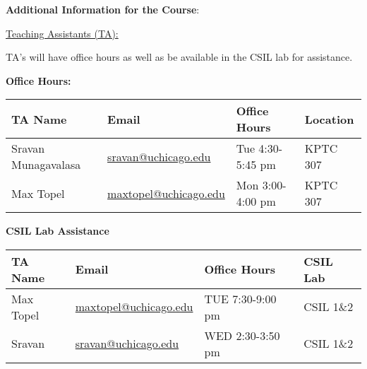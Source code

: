 \noindent \textbf {\Large \sc Additional Information for the Course}:

\vspace{1cm}

\noindent \underline{Teaching Assistants (TA):}

\noindent TA's will have office hours as well as be available in the CSIL lab for assistance.

\textbf{Office Hours:}

\begin{tabular}{l l | l | l }

TA Name & Email & Office Hours & Location \\ \hline

Sravan Munagavalasa & \href{mailto:sravan@uchicago.edu}{sravan@uchicago.edu}     & Tue 4:30-5:45 pm  & KPTC 307 \\
Max Topel           & \href{mailto:maxtopel@uchicago.edu}{maxtopel@uchicago.edu} & Mon 3:00-4:00 pm  & KPTC 307 \\


\end{tabular}

\vspace{1cm}

\textbf{CSIL Lab Assistance}

\begin{tabular}{l l | l | l }

TA Name & Email & Office Hours & CSIL Lab \\ \hline

Max Topel & \href{mailto:maxtopel@uchicago.edu}{maxtopel@uchicago.edu} & TUE  7:30-9:00 pm  & CSIL 1\&2 \\
Sravan    & \href{mailto:sravan@uchicago.edu}{sravan@uchicago.edu}     & WED  2:30-3:50 pm  & CSIL 1\&2 \\


\end{tabular}

\vspace{1cm}

